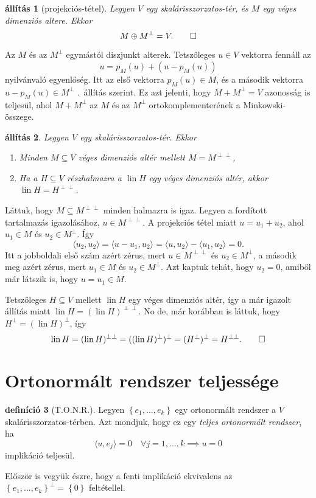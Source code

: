 \documentclass[9pt, a4paper, showtrims]{memoir}
\makeatletter
\renewenvironment{proof}[1][\proofname]
    {\par\pushQED{\qed}%
    \normalfont \topsep6\p@\@plus6\p@\relax
    \trivlist
    \item[\hskip\labelsep
        \itshape
    #1\@addpunct{:}]\ignorespaces}
    {\popQED\endtrivlist\@endpefalse}
\theoremstyle{plain}
\newtheorem{proposition}{állítás}[chapter]
\theoremstyle{remark}
\theoremstyle{definition}
\newtheorem{definition}[proposition]{definíció}
\DeclareMathOperator{\lin}{lin}
\newcommand{\ip}[2]{\langle#1,#2\rangle}
\makeatother
\begin{document}
\begin{proposition}[projekciós-tétel]\label{pr:projekcios}
	Legyen $V$ egy skalárisszorzatos-tér, és $M$ egy véges dimenziós altere.
	Ekkor
	\[
		M\oplus M^\perp=V.
		\qedhere
	\]
\end{proposition}
\begin{proof}
	Az $M$ és az $M^\perp$ egymástól diszjunkt alterek.
	Tetszőleges $u\in V$ vektorra fennáll az
	\[
		u=p_M\left( u \right)+\left( u-p_M\left( u \right) \right)
	\]
	nyilvánvaló egyenlőség.
	Itt az első vektorra $p_M\left( u \right)\in M$, és a második vektorra $u-p_M\left( u \right)\in M^\perp$
	.~állítás szerint.
	Ez azt jelenti, hogy $M+M^\perp=V$ azonosság is teljesül,
	ahol $M+M^\perp$ az $M$ és az $M^\perp$ ortokomplementerének a Minkowski-összege.
\end{proof}
\begin{proposition}
	Legyen $V$ egy skalárisszorzatos-tér.
	Ekkor
	\begin{enumerate}
		\item Minden $M\subseteq V$ véges dimenziós altér mellett $M=M^{\perp\perp}$,
		\item Ha a $H\subseteq V$ részhalmazra a $\lin H$ egy véges dimenziós altér, 
            akkor $\lin H=H^{\perp\perp}$.
		      \qedhere
	\end{enumerate}
\end{proposition}
\begin{proof}
	Láttuk, hogy $M\subseteq M^{\perp\perp}$ minden halmazra is igaz.
	Legyen a fordított tartalmazás igazolásához,
	$u\in M^{\perp\perp}$.
	A projekciós tétel miatt $u=u_1+u_2$,
	ahol $u_1\in M$ és $u_2\in M^{\perp}$.
	Így
	\[
		\ip{u_2}{u_2}
		=
		\ip{u-u_1}{u_2}
		=
		\ip{u}{u_2}-\ip{u_1}{u_2}=0.
	\]
	Itt a jobboldali első szám azért zérus,
	mert $u\in M^{\perp\perp}$ és $u_2\in M^\perp$,
	a második meg azért zérus,
	mert $u_1\in M$ és $u_2\in M^\perp$.
	Azt kaptuk tehát, hogy $u_2=0$, amiből már látszik is, hogy $u=u_1\in M$.

	Tetszőleges $H\subseteq V$ mellett $\lin H$ egy véges dimenziós altér,
	így a már igazolt állítás miatt
	$\lin H=(\lin H)^{\perp\perp}$.
	No de, már korábban is láttuk, hogy
	$H^{\perp}=(\lin H)^\perp$, így
	\[
		\lin H
		=
		(\lin H)^{\perp\perp}
		=
		((\lin H)^\perp)^\perp=(H^{\perp})^\perp=H^{\perp\perp}.
		\qedhere
	\]
\end{proof}
\section{Ortonormált rendszer teljessége}
\begin{definition}[T.O.N.R.]
	Legyen $\left\{ e_1,\ldots,e_k \right\}$ egy ortonormált rendszer a $V$ skalárisszorzatos-térben.
	Azt mondjuk, hogy ez egy \emph{teljes ortonormált rendszer}, ha
	\[
		\ip{u}{e_j}=0\quad\forall j=1,\ldots,k \implies u=0
	\]
	implikáció teljesül.
\end{definition}
Először is vegyük észre, hogy a fenti implikáció ekvivalens az
$\left\{ e_1,\ldots,e_k \right\}^\perp =\left\{ 0 \right\}$
feltétellel.
\end{document}
